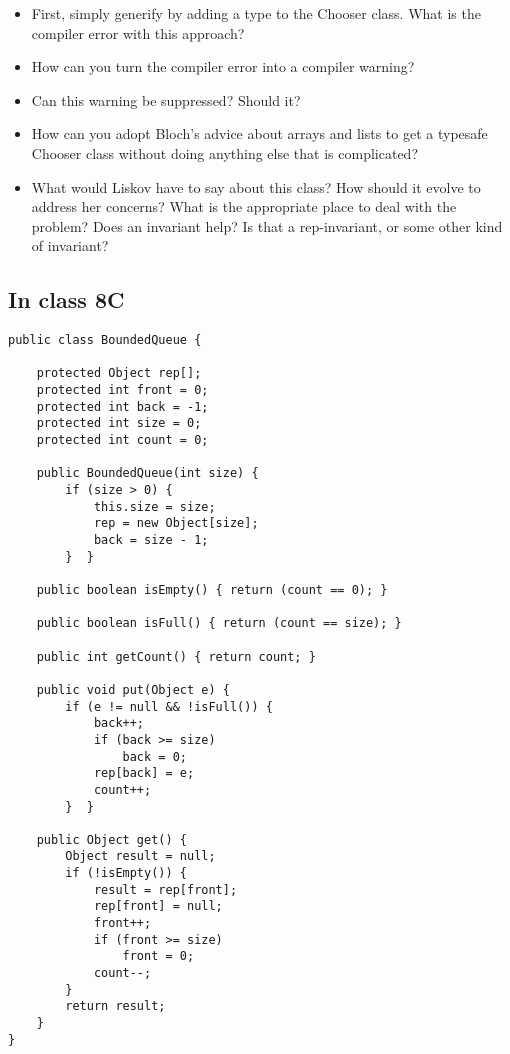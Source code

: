 \documentclass[11pt]{article}
\begin{document}
\begin{itemize}
\item First, simply generify by adding a type to the Chooser class. What is the compiler error with this approach?
\item How can you turn the compiler error into a compiler warning?
\item Can this warning be suppressed? Should it?
\item How can you adopt Bloch's advice about arrays and lists to get a typesafe Chooser class without doing anything else that is complicated?
\item What would Liskov have to say about this class? How should it evolve to address her concerns? What is the appropriate place to deal with the problem? Does an invariant help? Is that a rep-invariant, or some other kind of invariant?
\end{itemize}

\subsection{In class 8C}
\label{sec:orgb8a3276}
\begin{verbatim}
public class BoundedQueue {

    protected Object rep[];
    protected int front = 0;
    protected int back = -1;
    protected int size = 0;
    protected int count = 0;

    public BoundedQueue(int size) {
        if (size > 0) {
            this.size = size;
            rep = new Object[size];
            back = size - 1;
        }  }

    public boolean isEmpty() { return (count == 0); }

    public boolean isFull() { return (count == size); }

    public int getCount() { return count; }

    public void put(Object e) {
        if (e != null && !isFull()) {
            back++;
            if (back >= size)
                back = 0;
            rep[back] = e;
            count++;
        }  }

    public Object get() {
        Object result = null;
        if (!isEmpty()) {
            result = rep[front];
            rep[front] = null;
            front++;
            if (front >= size)
                front = 0;
            count--;
        }
        return result;
    }
}

\end{verbatim}
\end{document}
